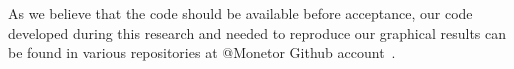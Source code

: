 As we believe that the code should be available before acceptance, our code
developed during this research and needed to reproduce our graphical results can
be found in various repositories at @Monetor Github
account~\cite{monetor-github}.
